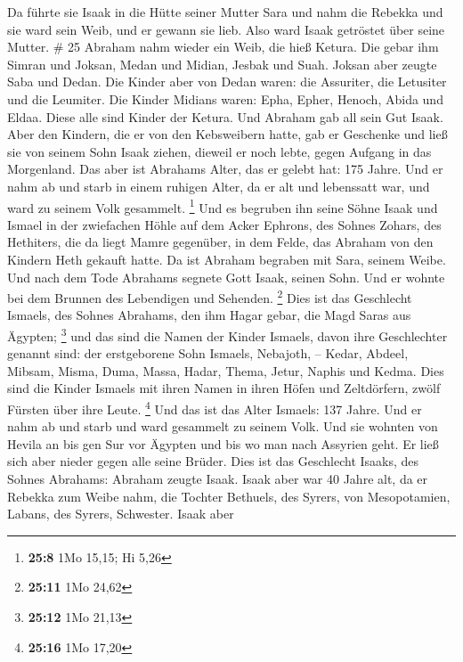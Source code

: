  Da führte sie Isaak in die Hütte seiner Mutter Sara und
nahm die Rebekka und sie ward sein Weib, und er gewann sie lieb. Also
ward Isaak getröstet über seine Mutter. \# 25  Abraham
nahm wieder ein Weib, die hieß Ketura.  Die gebar ihm
Simran und Joksan, Medan und Midian, Jesbak und Suah. 
Joksan aber zeugte Saba und Dedan. Die Kinder aber von Dedan waren: die
Assuriter, die Letusiter und die Leumiter.  Die Kinder
Midians waren: Epha, Epher, Henoch, Abida und Eldaa. Diese alle sind
Kinder der Ketura.  Und Abraham gab all sein Gut Isaak.
 Aber den Kindern, die er von den Kebsweibern hatte, gab
er Geschenke und ließ sie von seinem Sohn Isaak ziehen, dieweil er noch
lebte, gegen Aufgang in das Morgenland.  Das aber ist
Abrahams Alter, das er gelebt hat: 175 Jahre.  Und er nahm
ab und starb in einem ruhigen Alter, da er alt und lebenssatt war, und
ward zu seinem Volk gesammelt. \footnote{\textbf{25:8} 1Mo 15,15; Hi
  5,26}  Und es begruben ihn seine Söhne Isaak und Ismael
in der zwiefachen Höhle auf dem Acker Ephrons, des Sohnes Zohars, des
Hethiters, die da liegt Mamre gegenüber,  in dem Felde,
das Abraham von den Kindern Heth gekauft hatte. Da ist Abraham begraben
mit Sara, seinem Weibe.  Und nach dem Tode Abrahams
segnete Gott Isaak, seinen Sohn. Und er wohnte bei dem Brunnen des
Lebendigen und Sehenden. \footnote{\textbf{25:11} 1Mo 24,62}
 Dies ist das Geschlecht Ismaels, des Sohnes Abrahams,
den ihm Hagar gebar, die Magd Saras aus Ägypten; \footnote{\textbf{25:12}
  1Mo 21,13}  und das sind die Namen der Kinder Ismaels,
davon ihre Geschlechter genannt sind: der erstgeborene Sohn Ismaels,
Nebajoth, -- Kedar, Abdeel, Mibsam,  Misma, Duma, Massa,
 Hadar, Thema, Jetur, Naphis und Kedma. 
Dies sind die Kinder Ismaels mit ihren Namen in ihren Höfen und
Zeltdörfern, zwölf Fürsten über ihre Leute. \footnote{\textbf{25:16} 1Mo
  17,20}  Und das ist das Alter Ismaels: 137 Jahre. Und
er nahm ab und starb und ward gesammelt zu seinem Volk. 
Und sie wohnten von Hevila an bis gen Sur vor Ägypten und bis wo man
nach Assyrien geht. Er ließ sich aber nieder gegen alle seine Brüder.
 Dies ist das Geschlecht Isaaks, des Sohnes Abrahams:
Abraham zeugte Isaak.  Isaak aber war 40 Jahre alt, da er
Rebekka zum Weibe nahm, die Tochter Bethuels, des Syrers, von
Mesopotamien, Labans, des Syrers, Schwester.  Isaak aber
